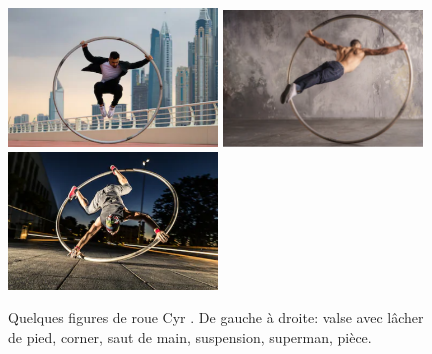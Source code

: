 \begin{figure}[h]
\includegraphics[width=210]{images_autres/suspension.png}
\includegraphics[width=200]{images_autres/superman.png}
\includegraphics[width=210]{images_autres/piece.png}
\caption{Quelques figures de roue Cyr  \cite{shutterstock}. De gauche à droite: valse avec lâcher de pied, corner, saut de main, suspension, superman, pièce.}
\label{fig:figures}
\end{figure}

